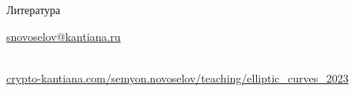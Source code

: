 \documentclass{beamer}
\begin{document}

\begin{frame}{Литература}
    \nocite{CohenFrey+2005}
    \nocite{Washington2008}
    \printbibliography
    
    \begin{center}
        \begin{tcolorbox}[enhanced,hbox,colback=block-green-color-bg,colframe=subsection-color!120,title=Контакты,center title]
            \begin{varwidth}{\textwidth}
                \begin{center}
                    \href{mailto:snovoselov@kantiana.ru}{snovoselov@kantiana.ru}
                \end{center}
            \end{varwidth}
        \end{tcolorbox}	
    \end{center}

\\
{\footnotesize
    \href{https://crypto-kantiana.com/semyon.novoselov/teaching/elliptic_curves_2023}{crypto-kantiana.com/semyon.novoselov/teaching/elliptic\_curves\_2023}
}
\end{frame}
\end{document}
